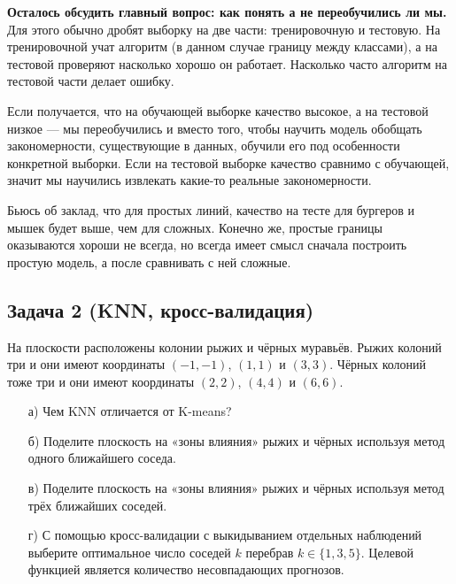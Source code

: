 \documentclass[12pt, a4paper, oneside]{article}
\begin{document}
{	\textbf{Осталось обсудить главный вопрос: как понять а не переобучились ли мы.}  Для этого обычно дробят выборку на две части: тренировочную и тестовую. На тренировочной учат алгоритм (в данном случае границу между классами), а на тестовой проверяют насколько хорошо он работает. Насколько часто алгоритм на тестовой части делает ошибку. 
	
	Если получается, что на обучающей выборке качество высокое, а на тестовой низкое --- мы переобучились и вместо того, чтобы научить модель обобщать закономерности, существующие в данных, обучили его под особенности конкретной выборки.  Если на тестовой выборке качество сравнимо с обучающей, значит мы научились извлекать какие-то реальные закономерности.
	
	Бьюсь об заклад, что для простых линий, качество на тесте для бургеров и мышек будет выше, чем для сложных.  Конечно же, простые границы оказываются хороши не всегда, но всегда имеет смысл сначала построить простую модель, а после сравнивать с ней сложные. 
}

\subsection*{Задача 2 (KNN, кросс-валидация)}

На плоскости расположены колонии рыжих и чёрных муравьёв. Рыжих колоний три и они имеют координаты $(-1, -1)$, $(1, 1)$ и $(3, 3)$. Чёрных колоний тоже три и они имеют координаты $(2, 2)$, $(4, 4)$ и $(6, 6)$.

\begin{enumerate}
	\item[а)] Чем KNN отличается от K-means? 
	\item[б)] Поделите плоскость на «зоны влияния» рыжих и чёрных используя метод одного ближайшего соседа.
	\item[в)] Поделите плоскость на «зоны влияния» рыжих и чёрных используя метод трёх ближайших соседей.
	\item[г)] С помощью кросс-валидации с выкидыванием отдельных наблюдений выберите оптимальное число соседей $k$ перебрав $k \in \{1, 3, 5\}$. Целевой функцией является количество несовпадающих прогнозов.
\end{enumerate}
\end{document}
